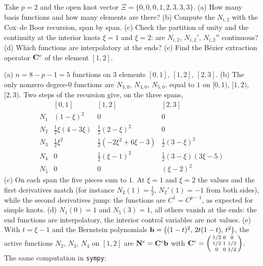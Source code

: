 \label{exo:bsplines}
%
Take $p=2$ and the open knot vector $\Xi=\{0,0,0,1,2,3,3,3\}$.
(a) How many basis functions and how many elements are there?
(b) Compute the $N_{i,2}$ with the Cox--de Boor recursion, span by span.
(c) Check the partition of unity and the continuity at the interior knots
$\xi=1$ and $\xi=2$: are $N_{i,2}$, $N_{i,2}'$, $N_{i,2}''$ continuous?
(d) Which functions are interpolatory at the ends?
(e) Find the B\'ezier extraction operator $\mathbf{C}^e$ of the element $[1,2]$.
\begin{solution}
(a) $n=8-p-1=5$ functions on $3$ elements $[0,1]$, $[1,2]$, $[2,3]$.
(b) The only nonzero degree-0 functions are $N_{3,0}$, $N_{4,0}$, $N_{5,0}$,
equal to $1$ on $[0,1)$, $[1,2)$, $[2,3)$. Two steps of the recursion give,
on the three spans,
\[
\begin{array}{llll}
 & [0,1] & [1,2] & [2,3]\\[2pt]
N_1 & (1-\xi)^2 & 0 & 0\\
N_2 & \tfrac12\xi(4-3\xi) & \tfrac12(2-\xi)^2 & 0\\
N_3 & \tfrac12\xi^2 & \tfrac12(-2\xi^2+6\xi-3) & \tfrac12(3-\xi)^2\\
N_4 & 0 & \tfrac12(\xi-1)^2 & \tfrac12(3-\xi)(3\xi-5)\\
N_5 & 0 & 0 & (\xi-2)^2
\end{array}
\]
(c) On each span the five pieces sum to $1$. At $\xi=1$ and $\xi=2$ the values
and the first derivatives match (for instance $N_2(1)=\tfrac12$,
$N_2'(1)=-1$ from both sides), while the second derivatives jump: the
functions are $C^1=C^{p-1}$, as expected for simple knots.
(d) $N_1(0)=1$ and $N_5(3)=1$, all others vanish at the ends: the end
functions are interpolatory, the interior control variables are not values.
(e) With $t=\xi-1$ and the Bernstein polynomials
$\mathbf{b}=\bigl((1-t)^2,\,2t(1-t),\,t^2\bigr)$, the active functions $N_2$, $N_3$,
$N_4$ on $[1,2]$ are
$\mathbf{N}^e=\mathbf{C}^e\mathbf{b}$ with
$\mathbf{C}^e=\begin{psmallmatrix}1/2&0&0\\1/2&1&1/2\\0&0&1/2\end{psmallmatrix}$.
The same computation in \texttt{sympy}:

\end{solution}

